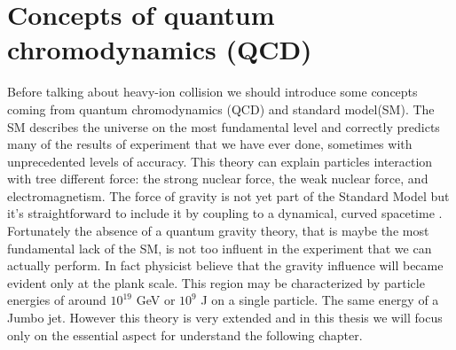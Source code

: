 \documentclass[12pt,a4paper]{book}
\begin{document}
	\chapter{Concepts of quantum chromodynamics (QCD)}
	Before talking about heavy-ion collision we should introduce some concepts coming from quantum chromodynamics (QCD) and standard model(SM). The SM describes the universe on the most fundamental level and correctly predicts many of the results of experiment that we have ever done, sometimes with unprecedented levels of accuracy. This theory can explain particles interaction with tree different force: the strong nuclear force, the weak nuclear force, and electromagnetism. The force of gravity is not yet part of the Standard Model but it’s straightforward to include it by coupling to a dynamical, curved spacetime \cite{quevedo2024cambridgelecturesstandardmodel}. Fortunately the absence of a quantum gravity theory, that is maybe the most fundamental lack of the SM, is not too influent in the experiment that we can actually perform. In fact physicist believe that the gravity influence will became evident only at the plank scale. This region may be characterized by particle energies of around $10^{19}$ GeV or $10^9$ J on a single particle. The same energy of a Jumbo jet. However this theory is very extended and in this thesis we will focus only on the essential aspect for understand the following chapter. 
	
\end{document}
